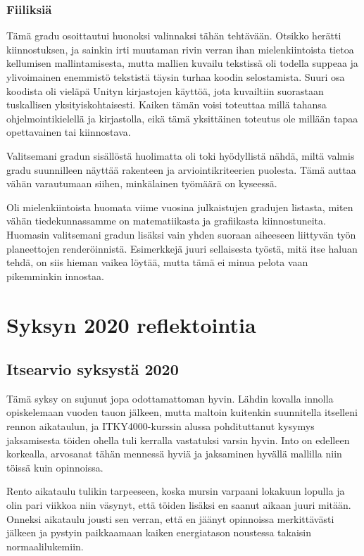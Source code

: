 \documentclass[utf8]{gradu3}
\begin{document}
\subsection{Fiiliksiä}

Tämä gradu osoittautui huonoksi valinnaksi tähän tehtävään. Otsikko herätti
kiinnostuksen, ja sainkin irti muutaman rivin verran ihan mielenkiintoista
tietoa kellumisen mallintamisesta, mutta mallien kuvailu tekstissä oli todella
suppeaa ja ylivoimainen enemmistö tekstistä täysin turhaa koodin selostamista.
Suuri osa koodista oli vieläpä Unityn kirjastojen käyttöä, jota kuvailtiin
suorastaan tuskallisen yksityiskohtaisesti. Kaiken tämän voisi toteuttaa millä
tahansa ohjelmointikielellä ja kirjastolla, eikä tämä yksittäinen toteutus ole
millään tapaa opettavainen tai kiinnostava.

Valitsemani gradun sisällöstä huolimatta oli toki hyödyllistä nähdä, miltä
valmis gradu suunnilleen näyttää rakenteen ja arviointikriteerien puolesta. Tämä
auttaa vähän varautumaan siihen, minkälainen työmäärä on kyseessä.

Oli mielenkiintoista huomata viime vuosina julkaistujen gradujen listasta, miten
vähän tiedekunnassamme on matematiikasta ja grafiikasta kiinnostuneita. Huomasin
valitsemani gradun lisäksi vain yhden suoraan aiheeseen liittyvän työn
planeettojen renderöinnistä. Esimerkkejä juuri sellaisesta työstä, mitä itse
haluan tehdä, on siis hieman vaikea löytää, mutta tämä ei minua pelota vaan
pikemminkin innostaa.


\chapter{Syksyn 2020 reflektointia}
\label{muitaAsioita}

\section{Itsearvio syksystä 2020}

Tämä syksy on sujunut jopa odottamattoman hyvin. Lähdin kovalla innolla
opiskelemaan vuoden tauon jälkeen, mutta maltoin kuitenkin suunnitella
itselleni rennon aikataulun, ja ITKY4000-kurssin alussa pohdituttanut kysymys
jaksamisesta töiden ohella tuli kerralla vastatuksi varsin hyvin. Into on
edelleen korkealla, arvosanat tähän mennessä hyviä ja jaksaminen hyvällä
mallilla niin töissä kuin opinnoissa.

Rento aikataulu tulikin tarpeeseen, koska mursin varpaani lokakuun lopulla ja
olin pari viikkoa niin väsynyt, että töiden lisäksi en saanut aikaan juuri
mitään. Onneksi aikataulu jousti sen verran, että en jäänyt opinnoissa
merkittävästi jälkeen ja pystyin paikkaamaan kaiken energiatason noustessa
takaisin normaalilukemiin.
\end{document}
